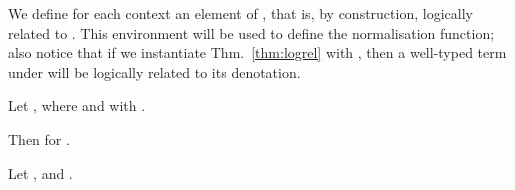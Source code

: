 \documentclass{LMCS}
\newcommand{\LONGVERSION}[1]{}
\newcommand{\SHORTVERSION}[1]{#1}
\newcommand{\LONGSHORT}[2]{\LONGVERSION{#1}\SHORTVERSION{#2}}
\begin{document}
\LONGSHORT{ We define for each context  an element
   of . This environment will be used to define the
  normalisation function.

}{
We define for each context  an element  of ,
that is, by construction, logically related to . This
environment will be used to define the normalisation function; also
notice that if we instantiate Thm.~\ref{thm:logrel} with
, then a well-typed term under  will be logically
related to its denotation.
}
\begin{defi}
  \label{def:canonical-env}
\LONGSHORT{
We define  by induction on  as follows:
      \label{eq:env-ctx}
    
}{
  Let , where
       and
       with .


Then  for .
}
\end{defi}\medskip

\LONGVERSION{
\noindent By an immediate induction on contexts we can check the following.

\begin{lem}\label{lem:logrelIdSub} If  then 
  . 
\end{lem}
\begin{proof}By induction on . See \ref{prf:logrelIdSub}
\end{proof}

\subsection{Main results}

Now we can define concretely the normalisation function as the
composition of reification with normalisation after evaluation under
the canonical environment. The following corollaries just instantiate
previous lemmata and theorems concluding correctness of NbE.

}

\begin{defi} 
  \label{def:nbe-alg}
  Let , and .
  
\end{defi}\medskip
\end{document}
